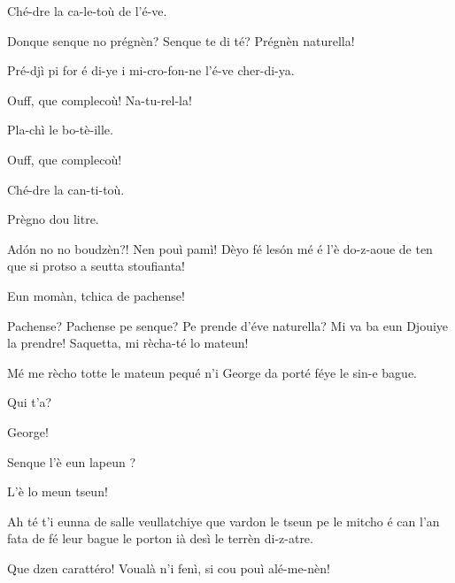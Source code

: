 \begin{drama}
\Machinaspeaks {} Ché-dre la ca-le-toù de l’é-ve.

\Claudinespeaks{} Donque senque no prégnèn? Senque te di té? Prégnèn naturella!


\Machinaspeaks {} Pré-djì pi for é di-ye i mi-cro-fon-ne l’é-ve cher-di-ya.

\Claudinespeaks Ouff, que complecoù!  Na-tu-rel-la!


\Machinaspeaks Pla-chì le bo-tè-ille.

\Claudinespeaks Ouff, que complecoù!


\Machinaspeaks Ché-dre la can-ti-toù.

\Claudinespeaks Prègno dou litre. 

\Giacospeaks{} Ad\'on no no boudzèn?! Nen pouì pamì! Dèyo fé les\'on mé é l'è do-z-aoue de ten que si protso  a seutta stoufianta!

\Claudinespeaks {} Eun momàn, tchica de pachense!

\Giacospeaks Pachense? Pachense pe senque? Pe prende d'éve naturella? Mi va ba eun Djouiye la prendre! Saquetta, mi rècha-té lo mateun! 

\Claudinespeaks{} Mé me rècho totte le mateun pequé n'i George da porté féye le sin-e bague\cacca .

\Giacospeaks Qui t'a?

\Claudinespeaks{} George!

\Giacospeaks Senque l'è eun lapeun \coniglio ?

\Claudinespeaks L'è lo meun tseun!

\Giacospeaks Ah té t'i eunna de salle veullatchiye que vardon le tseun pe le mitcho é can l’an fata de fé leur bague le porton ià desì le terrèn di-z-atre.

\Claudinespeaks Que dzen carattéro! Voualà n’i fenì, si cou pouì alé-me-nèn!


\end{drama}
